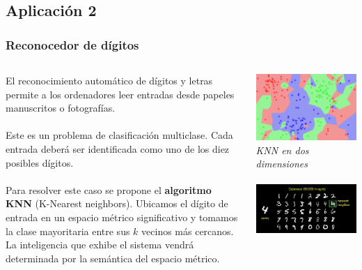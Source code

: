 \documentclass[8pt]{beamer}
\begin{document}
  \subsection{Aplicación 2}
    \begin{frame}
      \frametitle{Reconocedor de dígitos}
      \begin{columns}[c]
       \begin{column}{.5\textwidth}
	 \justifying
         El reconocimiento automático de dígitos y letras permite a los ordenadores
         leer entradas desde papeles manuscritos o fotografías.
         \\~\\
         Este es un problema de clasificación multiclase. Cada entrada deberá ser identificada
         como uno de los diez posibles dígitos.
         \\~\\
         Para resolver este caso se propone el \textbf{algoritmo KNN} (K-Nearest neighbors). 
         Ubicamos el dígito de entrada en un espacio métrico significativo y tomamos la clase mayoritaria 
         entre sus $k$ vecinos más cercanos. La inteligencia que exhibe el sistema vendrá
         determinada por la semántica del espacio métrico.
       \end{column}
       \begin{column}{.5\textwidth}
	  \begin{center}
	  \includegraphics[width=.8\textwidth]{imgs/knn.png} %
	  \\ \centering \textit{KNN en dos dimensiones}
	  \\~\\
	  \includegraphics[width=.8\textwidth]{imgs/digit_database.jpg} %

\end{center}
\end{column}
\end{columns}
\end{frame}
\end{document}
